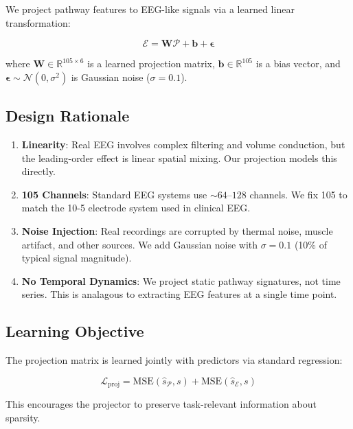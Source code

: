 We project pathway features to EEG-like signals via a learned linear transformation:

\begin{equation}
\mathcal{E} = \mathbf{W} \mathcal{P} + \mathbf{b} + \boldsymbol{\epsilon}
\end{equation}

where $\mathbf{W} \in \mathbb{R}^{105 \times 6}$ is a learned projection matrix, $\mathbf{b} \in \mathbb{R}^{105}$ is a bias vector, and $\boldsymbol{\epsilon} \sim \mathcal{N}(0, \sigma^2)$ is Gaussian noise ($\sigma = 0.1$).

\subsection*{Design Rationale}

\begin{enumerate}
    \item \textbf{Linearity}: Real EEG involves complex filtering and volume conduction, but the leading-order effect is linear spatial mixing. Our projection models this directly.
    
    \item \textbf{105 Channels}: Standard EEG systems use $\sim 64$--$128$ channels. We fix 105 to match the 10-5 electrode system used in clinical EEG.
    
    \item \textbf{Noise Injection}: Real recordings are corrupted by thermal noise, muscle artifact, and other sources. We add Gaussian noise with $\sigma = 0.1$ (10\% of typical signal magnitude).
    
    \item \textbf{No Temporal Dynamics}: We project static pathway signatures, not time series. This is analagous to extracting EEG features at a single time point.
\end{enumerate}

\subsection*{Learning Objective}

The projection matrix is learned jointly with predictors via standard regression:

\begin{equation}
\mathcal{L}_{\text{proj}} = \text{MSE}(\hat{s}_{\mathcal{P}}, s) + \text{MSE}(\hat{s}_{\mathcal{E}}, s)
\end{equation}

This encourages the projector to preserve task-relevant information about sparsity.
